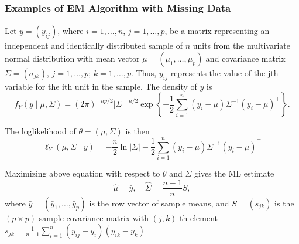 \subsubsection{Examples of EM Algorithm with Missing Data}

\begin{example}
	Let \(y=\left(y_{i j}\right)\), where \(i=1, \ldots, n\), \(j=1, \ldots, p\), be a matrix representing an independent and identically distributed sample of \(n\) units from the multivariate normal distribution with mean vector \(\mu=\left(\mu_{1}, \ldots, \mu_{p}\right)\) and covariance matrix \(\Sigma=(\sigma_{j k})\), \(j=1, \ldots, p\); \(k=1,\ldots, p\). Thus, \(y_{i j}\) represents the value of the jth variable for the ith unit in the sample. The density of \(y\) is
	\begin{equation}
		f_{Y}(y\mid\mu,\Sigma)=(2 \pi)^{-n p / 2}|\Sigma|^{-n / 2} \exp \left\{-\frac{1}{2} \sum_{i=1}^{n}\left(y_{i}-\mu\right) \Sigma^{-1}\left(y_{i}-\mu\right)^{\top}\right\}.
	\end{equation}

	The loglikelihood of \(\theta=(\mu, \Sigma)\) is then
	\begin{equation}
		\ell_{Y}(\mu, \Sigma \mid y)=-\frac{n}{2}\ln |\Sigma|-\frac{1}{2} \sum_{i=1}^{n}\left(y_{i}-\mu\right) \Sigma^{-1}\left(y_{i}-\mu\right)^{\top}
	\end{equation}

	Maximizing above equation with respect to \(\theta\) and \(\Sigma\) gives the ML estimate
	\begin{equation}
		\hat{\mu}=\bar{y},\quad \hat{\Sigma}=\frac{n-1}{n}S,
	\end{equation}
	where \(\bar{y}=\left(\bar{y}_{1}, \ldots, \bar{y}_{p}\right)\) is the row vector of sample means, and \(S=\left(s_{j k}\right)\) is the \((p\times p)\) sample covariance matrix with \((j, k)\) th element \(s_{j k}=\frac{1}{n-1}\sum_{i=1}^{n}\left(y_{i j}-\bar{y}_{i}\right)\left(y_{i k}-\bar{y}_{k}\right)\)
\end{example}

